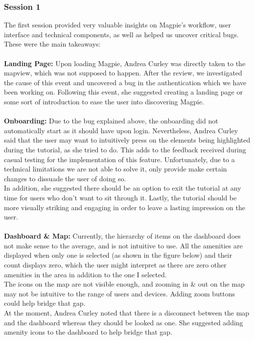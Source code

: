 \newpage
\subsubsection{Session 1}
The first session provided very valuable insights on Magpie's workflow, user interface and technical components, as well as helped us uncover critical bugs. These were the main takeaways:\\ \\
\textbf{Landing Page: }
Upon loading Magpie, Andrea Curley was directly taken to the map\-view, which was not supposed to happen. After the review, we investigated the cause of this event and uncovered a bug in the authentication which we have been working on. Following this event, she suggested creating a landing page or some sort of introduction to ease the user into discovering Magpie.\\ \\
\textbf{Onboarding: }
Due to the bug explained above, the onboarding did not automatically start as it should have upon login. Nevertheless, Andrea Curley said that the user may want to intuitively press on the elements being highlighted during the tutorial, as she tried to do. This adds to the feedback received during casual testing for the implementation of this feature. Unfortunately, due to a technical limitations we are not able to solve it, only provide make certain changes to dissuade the user of doing so.\\
In addition, she suggested there should be an option to exit the tutorial at any time for users who don't want to sit through it. Lastly, the tutorial should be more visually striking and engaging in order to leave a lasting impression on the user.\\ \\
\textbf{Dashboard \& Map: }
Currently, the hierarchy of items on the dashboard does not make sense to the average, and is not intuitive to use. All the amenities are displayed when only one is selected (as shown in the figure below) and their count displays zero, which the user might interpret as there are zero other amenities in the area in addition to the one I selected.\\
The icons on the map are not visible enough, and zooming in \& out on the map may not be intuitive to the range of users and devices. Adding zoom buttons could help bridge that gap. \\
At the moment, Andrea Curley noted that there is a disconnect between the map and the dashboard whereas they should be looked as one. She suggested adding amenity icons to the dashboard to help bridge that gap.
